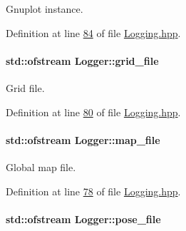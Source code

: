 Gnuplot instance. 



Definition at line \hyperlink{Logging_8hpp_source_l00084}{84} of file \hyperlink{Logging_8hpp_source}{Logging.\+hpp}.

\paragraph[{\texorpdfstring{grid\+\_\+file}{grid_file}}]{\setlength{\rightskip}{0pt plus 5cm}std\+::ofstream Logger\+::grid\+\_\+file\hspace{0.3cm}{\ttfamily [private]}}\hypertarget{classLogger_a715ae637741f3b00ba8ebb9858cb5577}{}\label{classLogger_a715ae637741f3b00ba8ebb9858cb5577}


Grid file. 



Definition at line \hyperlink{Logging_8hpp_source_l00080}{80} of file \hyperlink{Logging_8hpp_source}{Logging.\+hpp}.

\paragraph[{\texorpdfstring{map\+\_\+file}{map_file}}]{\setlength{\rightskip}{0pt plus 5cm}std\+::ofstream Logger\+::map\+\_\+file\hspace{0.3cm}{\ttfamily [private]}}\hypertarget{classLogger_a1aedce7141d1346bc39c94e3a3eba4d6}{}\label{classLogger_a1aedce7141d1346bc39c94e3a3eba4d6}


Global map file. 



Definition at line \hyperlink{Logging_8hpp_source_l00078}{78} of file \hyperlink{Logging_8hpp_source}{Logging.\+hpp}.

\paragraph[{\texorpdfstring{pose\+\_\+file}{pose_file}}]{\setlength{\rightskip}{0pt plus 5cm}std\+::ofstream Logger\+::pose\+\_\+file\hspace{0.3cm}{\ttfamily [private]}}\hypertarget{classLogger_a7314c685ce4579a7d8b118e5d5327d13}{}\label{classLogger_a7314c685ce4579a7d8b118e5d5327d13}


